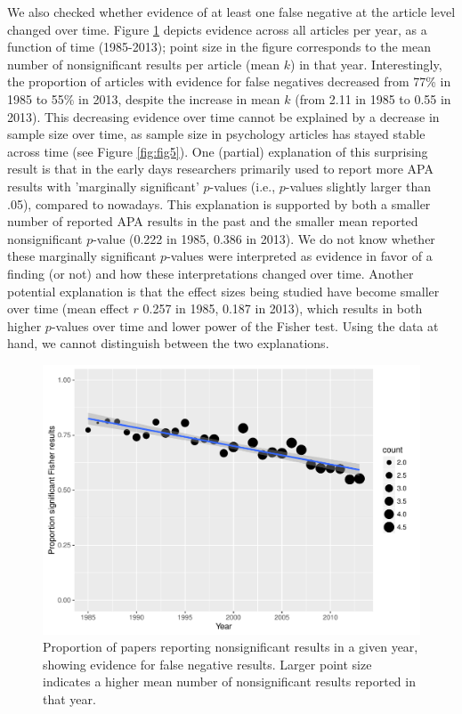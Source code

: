 \documentclass{article}
\begin{document}
We also checked whether evidence of at least one false negative at the article level changed over time. Figure \ref{fig:fig4} depicts evidence across all articles per year, as a function of time (1985-2013); point size in the figure corresponds to the mean number of nonsignificant results per article (mean $k$) in that year. Interestingly, the proportion of articles with evidence for false negatives decreased from 77\% in 1985 to 55\% in 2013, despite the increase in mean $k$ (from 2.11 in 1985 to 0.55 in 2013). This decreasing evidence over time cannot be explained by a decrease in sample size over time, as sample size in psychology articles has stayed stable across time (see Figure \ref{fig:fig5}). One (partial) explanation of this surprising result is that in the early days researchers primarily used to report more APA results with 'marginally significant' $p$-values (i.e., $p$-values slightly larger than .05), compared to nowadays. This explanation is supported by both a smaller number of reported APA results in the past and the smaller mean reported nonsignificant $p$-value (0.222 in 1985, 0.386 in 2013). We do not know whether these marginally significant $p$-values were interpreted as evidence in favor of a finding (or not) and how these interpretations changed over time. Another potential explanation is that the effect sizes being studied have become smaller over time (mean effect $r$ 0.257 in 1985, 0.187 in 2013), which results in both higher $p$-values over time and lower power of the Fisher test. Using the data at hand, we cannot distinguish between the two explanations.

\begin{figure}
\begin{center}
\includegraphics{../figures/Fig4.pdf}
\end{center}
\caption{Proportion of papers reporting nonsignificant results in a given year, showing evidence for false negative results. Larger point size indicates a higher mean number of nonsignificant results reported in that year.}
\label{fig:fig4}
\end{figure}
\end{document}
